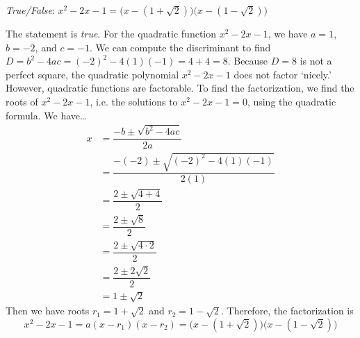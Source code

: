 \documentclass[11pt,letterpaper]{article}
\begin{document}
\quizsol \textit{True/False}: $x^2 - 2x - 1= \big(x - (1 + \sqrt{2}) \big)\big(x - (1 - \sqrt{2}) \big)$ \pspace

\sol The statement is \textit{true}. For the quadratic function $x^2 - 2x - 1$, we have $a= 1$, $b= -2$, and $c= -1$. We can compute the discriminant to find $D= b^2 - 4ac= (-2)^2 - 4(1)(-1)= 4 + 4= 8$. Because $D= 8$ is not a perfect square, the quadratic polynomial $x^2 - 2x - 1$ does not factor `nicely.' However,  quadratic functions are factorable. To find the factorization, we find the roots of $x^2 - 2x - 1$, i.e. the solutions to $x^2 - 2x - 1= 0$, using the quadratic formula. We have\dots
	\[
	\begin{aligned}
	x&= \dfrac{-b \pm \sqrt{b^2 - 4ac}}{2a} \\
	&= \dfrac{-(-2) \pm \sqrt{(-2)^2 - 4(1)(-1)}}{2(1)} \\
	&= \dfrac{2 \pm \sqrt{4 + 4}}{2} \\
	&= \dfrac{2 \pm \sqrt{8}}{2} \\
	&= \dfrac{2 \pm \sqrt{4 \cdot 2}}{2} \\
	&= \dfrac{2 \pm 2 \sqrt{2}}{2} \\
	&= 1 \pm \sqrt{2}
	\end{aligned}
	\]
Then we have roots $r_1= 1 + \sqrt{2}$ and $r_2= 1 - \sqrt{2}$. Therefore, the factorization is
	\[
	x^2 - 2x - 1= a (x - r_1)(x - r_2)= \big(x - (1 + \sqrt{2}) \big)\big(x - (1 - \sqrt{2}) \big)
	\]
\end{document}
